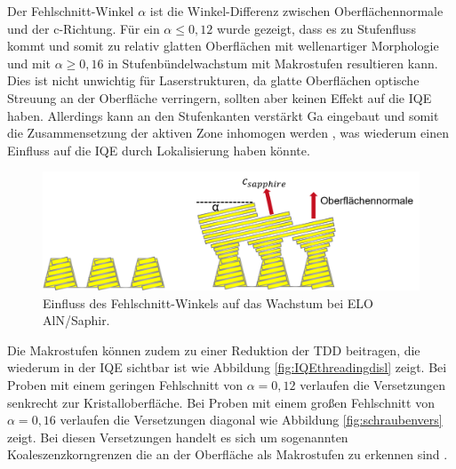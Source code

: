 Der Fehlschnitt-Winkel $\alpha$ ist die Winkel-Differenz zwischen Oberflächennormale und der c-Richtung. Für ein $\alpha \leq 0,12 $ wurde gezeigt, dass es zu Stufenfluss kommt und somit zu relativ glatten Oberflächen mit wellenartiger Morphologie und mit $\alpha \geq 0,16 $ in Stufenbündelwachstum mit Makrostufen resultieren kann. Dies ist nicht unwichtig für Laserstrukturen, da glatte Oberflächen optische Streuung an der Oberfläche verringern, sollten aber keinen Effekt auf die IQE haben. Allerdings kann an den Stufenkanten verstärkt Ga eingebaut und somit die Zusammensetzung der aktiven Zone inhomogen werden \cite{zeimeru} \cite{MOGILATENKO2014222} \cite{fmehnke}, was wiederum einen Einfluss auf die IQE durch Lokalisierung haben könnte.
%
\begin{figure}[htb]
\includegraphics[width=\linewidth]{Bilder/offcut.png}
\caption{Einfluss des Fehlschnitt-Winkels auf das Wachstum bei ELO AlN/Saphir.}
\label{fig:offcut}
\end{figure}
\noindent 
%
Die Makrostufen können zudem zu einer Reduktion der TDD beitragen, die wiederum in der IQE sichtbar ist wie Abbildung \ref{fig:IQEthreadingdisl} zeigt. Bei Proben mit einem geringen Fehlschnitt von $\alpha = 0,12 $ verlaufen die Versetzungen senkrecht zur Kristalloberfläche. Bei Proben mit einem großen Fehlschnitt von $\alpha = 0,16 $ verlaufen die Versetzungen diagonal wie Abbildung \ref{fig:schraubenvers} zeigt. Bei diesen Versetzungen handelt es sich um sogenannten Koaleszenzkorngrenzen die an der Oberfläche als Makrostufen zu erkennen sind \cite{MOGILATENKO2014222}. 
%
